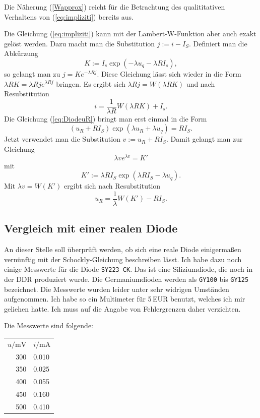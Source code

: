 \documentclass[a4paper,10pt,fleqn,twocolumn,twoside]{scrartcl}
\numberwithin{equation}{section}
\begin{document}
Die Näherung (\ref{Wapprox}) reicht für die Betrachtung des
qualititativen Verhaltens von (\ref{eq:impliziti}) bereits aus.

Die Gleichung (\ref{eq:impliziti}) kann mit der Lambert-W-Funktion
aber auch exakt gelöst werden. Dazu macht man die Substitution
$j:=i-I_S$. Definiert man die Abkürzung%
\begin{equation}
K:=I_s\exp(-\lambda u_q-\lambda RI_s),
\end{equation}
so gelangt man zu $j=Ke^{-\lambda Rj}$. Diese Gleichung lässt sich
wieder in die Form $\lambda RK=\lambda Rje^{\lambda Rj}$
bringen. Es ergibt sich $\lambda Rj=W(\lambda RK)$ und
nach Resubstitution%
\begin{equation}
i = \frac{1}{\lambda R}W(\lambda RK)+I_s.
\end{equation}
Die Gleichung (\ref{eq:DiodeuR}) bringt man erst einmal in die
Form%
\begin{equation}
(u_R+RI_S)\exp(\lambda u_R+\lambda u_q) = RI_S.
\end{equation}
Jetzt verwendet man die Substitution
$v:=u_R+RI_S$. Damit gelangt man zur Gleichung%
\begin{equation}
\lambda ve^{\lambda v}=K'
\end{equation}
mit
\begin{equation}
K':=\lambda RI_S\exp(\lambda RI_S-\lambda u_q).
\end{equation}
Mit $\lambda v=W(K')$ ergibt sich nach Resubstitution%
\begin{equation}
u_R = \frac{1}{\lambda} W(K')-RI_S.
\end{equation}

\subsection{Vergleich mit einer realen Diode}
An dieser Stelle soll überprüft werden, ob sich eine
reale Diode einigermaßen vernünftig mit der Schockly-Gleichung
beschreiben lässt. Ich habe dazu noch einige Messwerte für
die Diode \texttt{SY223 CK}. Das ist eine Siliziumdiode, die noch
in der DDR produziert wurde. Die Germaniumdioden werden als
\texttt{GY100} bis \texttt{GY125} bezeichnet. Die Messwerte wurden
leider unter sehr widrigen Umständen aufgenommen. Ich habe so ein
Multimeter für 5\,EUR benutzt, welches ich mir geliehen hatte.
Ich muss auf die Angabe von Fehlergrenzen daher verzichten.

Die Messwerte sind folgende:

{\normalfont\ttfamily
\begin{tabular}{r|l}
$u/\mathrm{mV}$ & $i/\mathrm{mA}$\\
300 & 0.010\\
350 & 0.025\\
400 & 0.055\\
450 & 0.160\\
500 & 0.410
\end{tabular}
}
\end{document}
